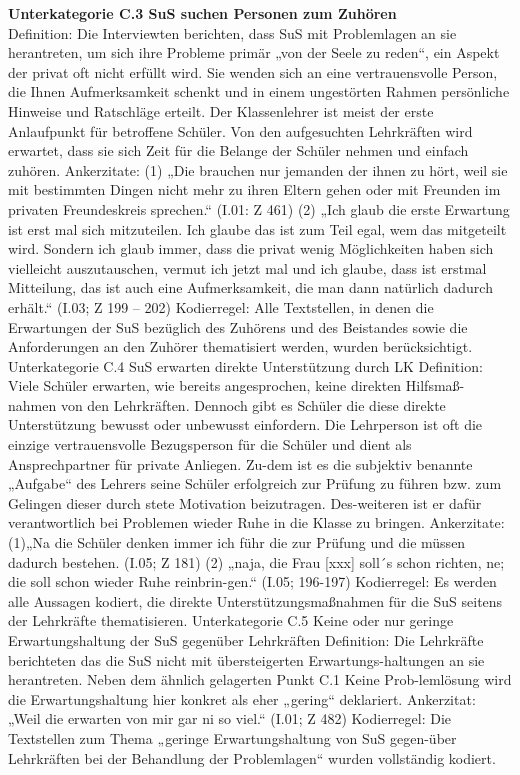 \textbf{Unterkategorie C.3 SuS suchen Personen zum Zuhören}\\
Definition: Die Interviewten berichten, dass SuS mit Problemlagen an sie herantreten, um sich ihre Probleme primär „von der Seele zu reden“, ein Aspekt der privat oft nicht erfüllt wird. Sie wenden sich an eine vertrauensvolle Person, die Ihnen Aufmerksamkeit schenkt und in einem ungestörten Rahmen persönliche Hinweise und Ratschläge erteilt. Der Klassenlehrer ist meist der erste Anlaufpunkt für betroffene Schüler. Von den aufgesuchten Lehrkräften wird erwartet, dass sie sich Zeit für die Belange der Schüler nehmen und einfach zuhören. 
Ankerzitate:
(1) „Die brauchen nur jemanden der ihnen zu hört, weil sie mit bestimmten Dingen nicht mehr zu ihren Eltern gehen oder mit Freunden im privaten Freundeskreis sprechen.“ (I.01: Z 461)
(2) „Ich glaub die erste Erwartung ist erst mal sich mitzuteilen. Ich glaube das ist zum Teil egal, wem das mitgeteilt wird. Sondern ich glaub immer, dass die privat wenig Möglichkeiten haben sich vielleicht auszutauschen, vermut ich jetzt mal und ich glaube, dass ist erstmal Mitteilung, das ist auch eine Aufmerksamkeit, die man dann natürlich dadurch erhält.“ (I.03; Z 199 – 202)
Kodierregel: Alle Textstellen, in denen die Erwartungen der SuS bezüglich des Zuhörens und des Beistandes sowie die Anforderungen an den Zuhörer thematisiert werden, wurden berücksichtigt.
Unterkategorie C.4 SuS erwarten direkte Unterstützung durch LK
Definition: Viele Schüler erwarten, wie bereits angesprochen, keine direkten Hilfsmaß-nahmen von den Lehrkräften. Dennoch gibt es Schüler die diese direkte Unterstützung bewusst oder unbewusst einfordern. Die Lehrperson ist oft die einzige vertrauensvolle Bezugsperson für die Schüler und dient als Ansprechpartner für private Anliegen. Zu-dem ist es die subjektiv benannte „Aufgabe“ des Lehrers seine Schüler erfolgreich zur Prüfung zu führen bzw. zum Gelingen dieser durch stete Motivation beizutragen. Des-weiteren ist er dafür verantwortlich bei Problemen wieder Ruhe in die Klasse zu bringen.
Ankerzitate: 
(1)„Na die Schüler denken immer ich führ die zur Prüfung und die müssen dadurch bestehen. (I.05; Z 181)
(2) „naja, die Frau [xxx] soll´s schon richten, ne; die soll schon wieder Ruhe reinbrin-gen.“ (I.05; 196-197)
Kodierregel:
Es werden alle Aussagen kodiert, die direkte Unterstützungsmaßnahmen für die SuS seitens der Lehrkräfte thematisieren.
Unterkategorie C.5 Keine oder nur geringe Erwartungshaltung der SuS gegenüber Lehrkräften
Definition: Die Lehrkräfte berichteten das die SuS nicht mit übersteigerten Erwartungs-haltungen an sie herantreten. Neben dem ähnlich gelagerten Punkt C.1 Keine Prob-lemlösung wird die Erwartungshaltung hier konkret als eher „gering“ deklariert.
Ankerzitat:
 „Weil die erwarten von mir gar ni so viel.“ (I.01; Z 482)
Kodierregel: Die Textstellen zum Thema „geringe Erwartungshaltung von SuS gegen-über Lehrkräften bei der Behandlung der Problemlagen“ wurden vollständig kodiert.


